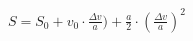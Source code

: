 \documentclass[preview]{standalone}
\begin{document}
\begin{align*}
S = S_{0} + v_{0} \cdot \frac{\Delta v}{a}) + \frac{a}{2} \cdot (\frac{\Delta v}{a})^2
\end{align*}
\end{document}
